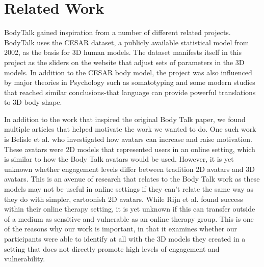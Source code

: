\documentclass[journal]{vgtc}                %
\begin{document}
\section{Related Work}
\noindent BodyTalk gained inspiration from a number of different related projects. BodyTalk uses the CESAR dataset, a publicly available statistical model from 2002, as the basis for 3D human models. The dataset manifests itself in this project as the sliders on the website that adjust sets of parameters in the 3D models. In addition to the CESAR body model, the project was also influenced by major theories in Psychology such as somatotyping and some modern studies that reached similar conclusions-that language can provide powerful translations to 3D body shape.

\noindent In addition to the work that inspired the original Body Talk paper, we found multiple articles that helped motivate the work
we wanted to do. One such work is Belisle et al. who investigated how avatars can increase and raise motivation\cite{Belisle:2010:PM}.
These avatars were 2D models that represented users in an online setting, which is similar to how the Body Talk avatars would be used.
However, it is yet unknown whether engagement levels differ between tradition 2D avatars and 3D avatars. This is an avenue of research
that relates to the Body Talk work as these models may not be useful in online settings if they can't relate the same way as they
do with simpler, cartoonish 2D avatars. While Rijn et al. found success within their online therapy setting, it is yet
unknown if this can transfer outside of a medium as sensitive and vulnerable as an online therapy group\cite{Rijn:2015:BJGC}.
This is one of the reasons why our work is important, in that it examines whether
our participants were able to identify at all with the 3D models they created in a setting that does not directly promote
high levels of engagement and vulnerability.
\end{document}
